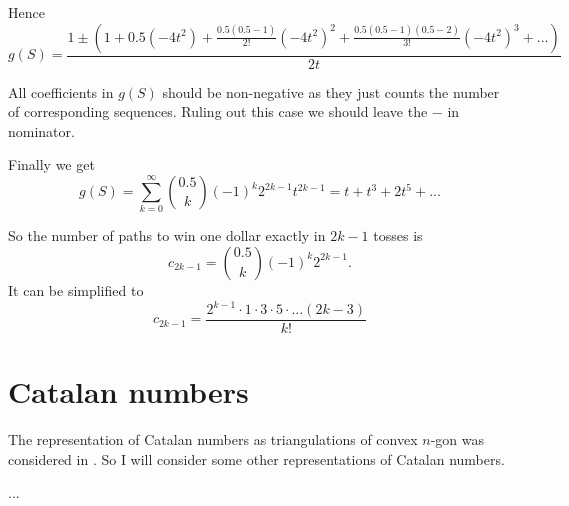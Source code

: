 \documentclass{article}
\begin{document}
Hence 
\[
g(S)  = \frac{1\pm \left(1 + 0.5 (-4t^2) + \frac{0.5(0.5- 1)}{2!}(-4t^2)^2 + \frac{0.5(0.5 - 1)(0.5 - 2)}{3!}(-4t^2)^3 +\ldots    \right)}{2t}	
\]

All coefficients in $g(S)$ should be non-negative as they just counts the number of corresponding sequences.
Ruling out this case we should leave the $-$ in nominator. 

Finally we get
\[
g(S) = \sum_{k=0}^{\infty} \binom{0.5}{k} (-1)^k 2^{2k - 1} t^{2k - 1} = t + t^3 + 2t^5 + \ldots 	
\]


So the number of paths to win one dollar exactly in $2k - 1$ tosses is 
\[
	c_{2k - 1} = \binom{0.5}{k} (-1)^k 2^{2k - 1}.
\]
It can be simplified to
\[
  c_{2k - 1} = \frac{2^{k-1}\cdot 1\cdot 3 \cdot 5 \cdot \ldots (2k - 3)}{k!}	
\]




\section{Catalan numbers}

The representation of Catalan numbers as triangulations of convex $n$-gon 
was considered in \cite{polya1956picture}. 
So I will consider some other representations of Catalan numbers.


...












\end{document}
